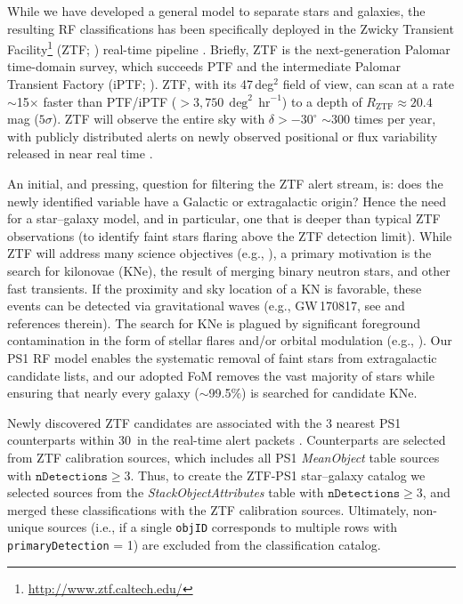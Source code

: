 \documentclass[twocolumn, dvipdfmx]{aastex62}
\begin{document}
While we have developed a general model to separate stars and galaxies, the
resulting RF classifications has been specifically deployed in the Zwicky
Transient Facility\footnote{\url{http://www.ztf.caltech.edu/}} (ZTF;
\citealt{Bellm:18:ZTF, Dekany:18:ZTF}) real-time pipeline
\citep{Masci:18:ZTF}. Briefly, ZTF is the next-generation Palomar
time-domain survey, which succeeds PTF \citep{Rau09, Law09} and the
intermediate Palomar Transient Factory (iPTF; \citealt{Kulkarni13}). ZTF,
with its 47\,deg$^2$ field of view, can scan at a rate $\sim$15$\times$
faster than PTF/iPTF ($>3{,}750\,\deg^2\,\mathrm{hr}^{-1}$) to a depth of
$R_\mathrm{ZTF} \approx 20.4$\,mag ($5\sigma$). ZTF will observe the entire
sky with $\delta > -30^{\circ}$ $\sim$300 times per year, with publicly
distributed alerts on newly observed positional or flux variability released
in near real time \citep{Patterson:18:ZTF}.

An initial, and pressing, question for filtering the ZTF alert stream, is:
does the newly identified variable have a Galactic or extragalactic origin?
Hence the need for a star--galaxy model, and in particular, one that is
deeper than typical ZTF observations (to identify faint stars flaring above
the ZTF detection limit). While ZTF will address many science objectives
(e.g., \citealt{Graham:18:ZTF}), a primary motivation is the search for
kilonovae (KNe), the result of merging binary neutron stars, and other fast
transients. If the proximity and sky location of a KN is favorable, these
events can be detected via gravitational waves (e.g., GW\,170817, see
\citealt{Abbott17} and references therein). The search for KNe is plagued by
significant foreground contamination in the form of stellar flares and/or
orbital modulation (e.g., \citealt{Kulkarni06, Berger12, Kasliwal16}). Our
PS1 RF model enables the systematic removal of faint stars from
extragalactic candidate lists, and our adopted FoM removes the vast majority
of stars while ensuring that nearly every galaxy ($\sim$99.5\%) is searched
for candidate KNe.

Newly discovered ZTF candidates are associated with the 3 nearest PS1
counterparts within 30\arcsec\ in the real-time alert packets
\citep{Masci:18:ZTF}. Counterparts are selected from ZTF calibration
sources, which includes all PS1 \textit{MeanObject} table sources with
$\mathtt{nDetections} \ge 3$. Thus, to create the ZTF-PS1 star--galaxy
catalog we selected sources from the \textit{StackObjectAttributes} table
with $\mathtt{nDetections} \ge 3$, and merged these classifications with the
ZTF calibration sources. Ultimately, non-unique sources (i.e., if a single
\texttt{objID} corresponds to multiple rows with \texttt{primaryDetection} =
1) are excluded from the classification catalog.
\end{document}
